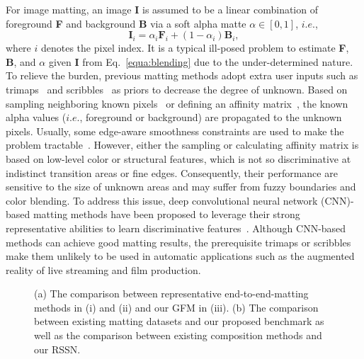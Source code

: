 \documentclass[twocolumn]{svjour3}
\begin{document}
For image matting, an image \textbf{I} is assumed to be a linear combination of foreground \textbf{F} and background \textbf{B} via a soft alpha matte $\alpha \in \left[0,1\right]$, $i.e.$,
\begin{equation}
\textbf{I}_i = \alpha_i \textbf{F}_i + \left(1-\alpha_i \right) \textbf{B}_i,
\label{equa:blending}
\end{equation}
where $i$ denotes the pixel index. It is a typical ill-posed problem to estimate \textbf{F}, \textbf{B}, and $\alpha$ given \textbf{I} from Eq.~\eqref{equa:blending} due to the under-determined nature. To relieve the burden, previous matting methods adopt extra user inputs such as trimaps~\citep{xu2017deep} and scribbles~\citep{levin2007closed} as priors to decrease the degree of unknown. Based on sampling neighboring known pixels~\citep{wang2007optimized,ruzon2000alpha,wang2005iterative} or defining an affinity matrix~\citep{zheng2008fuzzymatte}, the known alpha values ($i.e.$, foreground or background) are propagated to the unknown pixels. Usually, some edge-aware smoothness constraints are used to make the problem tractable~\citep{levin2007closed}. However, either the sampling or calculating affinity matrix is based on low-level color or structural features, which is not so discriminative at indistinct transition areas or fine edges. Consequently, their performance are sensitive to the size of unknown areas and may suffer from fuzzy boundaries and color blending. To address this issue, deep convolutional neural network (CNN)-based matting methods have been proposed\citep{xu2017deep,chen2018semantic,zhang2019late,Qiao_2020_CVPR,liu2020boosting,mgmatting} to leverage their strong representative abilities to learn discriminative features~\citep{zhang2020empowering}. Although CNN-based methods can achieve good matting results, the prerequisite trimaps or scribbles make them unlikely to be used in automatic applications such as the augmented reality of live streaming and film production. 

\begin{figure*}[!t]
\centering
{}
\hfil
{}
\caption{(a) The comparison between representative end-to-end-matting methods in (i) and (ii) and our GFM in (iii). (b) The comparison between existing matting datasets and our proposed benchmark as well as the comparison between existing composition methods and our RSSN.}
\label{fig:motivation}
\end{figure*}
\end{document}
